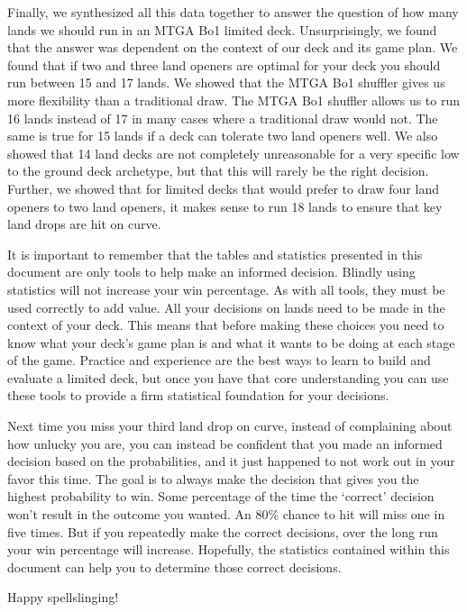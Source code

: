 \documentclass[oneside]{book}   %
\begin{document}
Finally, we synthesized all this data together to answer the question of how many lands we should run in an MTGA Bo1 limited deck. Unsurprisingly, we found that the answer was dependent on the context of our deck and its game plan. We found that if two and three land openers are optimal for your deck you should run between 15 and 17 lands. We showed that the MTGA Bo1 shuffler gives us more flexibility than a traditional draw. The MTGA Bo1 shuffler allows us to run 16 lands instead of 17 in many cases where a traditional draw would not. The same is true for 15 lands if a deck can tolerate two land openers well. We also showed that 14 land decks are not completely unreasonable for a very specific low to the ground deck archetype, but that this will rarely be the right decision. Further, we showed that for limited decks that would prefer to draw four land openers to two land openers, it makes sense to run 18 lands to ensure that key land drops are hit on curve.

It is important to remember that the tables and statistics presented in this document are only tools to help make an informed decision. Blindly using statistics will not increase your win percentage. As with all tools, they must be used correctly to add value. All your decisions on lands need to be made in the context of your deck. This means that before making these choices you need to know what your deck's game plan is and what it wants to be doing at each stage of the game. Practice and experience are the best ways to learn to build and evaluate a limited deck, but once you have that core understanding you can use these tools to provide a firm statistical foundation for your decisions.

Next time you miss your third land drop on curve, instead of complaining about how unlucky you are, you can instead be confident that you made an informed decision based on the probabilities, and it just happened to not work out in your favor this time. The goal is to always make the decision that gives you the highest probability to win. Some percentage of the time the `correct' decision won't result in the outcome you wanted. An 80\% chance to hit will miss one in five times. But if you repeatedly make the correct decisions, over the long run your win percentage will increase. Hopefully, the statistics contained within this document can help you to determine those correct decisions.

Happy spellslinging!

\appendix
\end{document}
